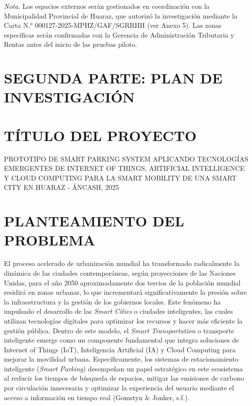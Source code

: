 \documentclass[12pt,a4paper]{article}
\newcommand{\tituloTesis}{PROTOTIPO DE SMART PARKING SYSTEM APLICANDO TECNOLOGÍAS EMERGENTES DE INTERNET OF THINGS, ARTIFICIAL INTELLIGENCE Y CLOUD COMPUTING PARA LA SMART MOBILITY DE UNA SMART CITY EN HUARAZ - ÁNCASH, 2025}
\begin{document}
\vspace{-0.3cm}

\noindent\parbox{\textwidth}{
	\setlength{\parindent}{0pt}
	\small
	\textit{Nota.} Los espacios externos serán gestionados en coordinación con la Municipalidad Provincial de Huaraz, que autorizó la investigación mediante la Carta N.° 000127-2025-MPHZ/GAF/SGRRHH (ver Anexo 5). Las zonas específicas serán confirmadas con la Gerencia de Administración Tributaria y Rentas antes del inicio de las pruebas piloto.
}

\newpage
\clearpage
{}
\setcounter{page}{1}

\renewcommand{\thepage}{\padzeroes[2]{\decimal{page}}}

\renewcommand{\thesection}{\Roman{section}}  %
\renewcommand{\thesubsection}{\arabic{section}.\arabic{subsection}}  %
\renewcommand{\thesubsubsection}{\arabic{section}.\arabic{subsection}.\arabic{subsubsection}}  %

\section*{SEGUNDA PARTE: PLAN DE INVESTIGACIÓN}

\section{TÍTULO DEL PROYECTO}
\tituloTesis

\section{PLANTEAMIENTO DEL PROBLEMA}

El proceso acelerado de urbanización mundial ha transformado radicalmente la dinámica de las ciudades contemporáneas, según proyecciones de las Naciones Unidas, para el año 2050 aproximadamente dos tercios de la población mundial residirá en zonas urbanas, lo que incrementará significativamente la presión sobre la infraestructura y la gestión de los gobiernos locales. Este fenómeno ha impulsado el desarrollo de las \textit{Smart Cities} o ciudades inteligentes, las cuales utilizan tecnologías digitales para optimizar los recursos y hacer más eficiente la gestión pública. Dentro de este modelo, el \textit{Smart Transportation} o transporte inteligente emerge como un componente fundamental que integra soluciones de Internet of Things (IoT), Inteligencia Artificial (IA) y Cloud Computing para mejorar la movilidad urbana. Específicamente, los sistemas de estacionamiento inteligente (\textit{Smart Parking}) desempeñan un papel estratégico en este ecosistema al reducir los tiempos de búsqueda de espacios, mitigar las emisiones de carbono por circulación innecesaria y optimizar la experiencia del usuario mediante el acceso a información en tiempo real (Gomstyn \& Jonker, s.f.).
\end{document}
